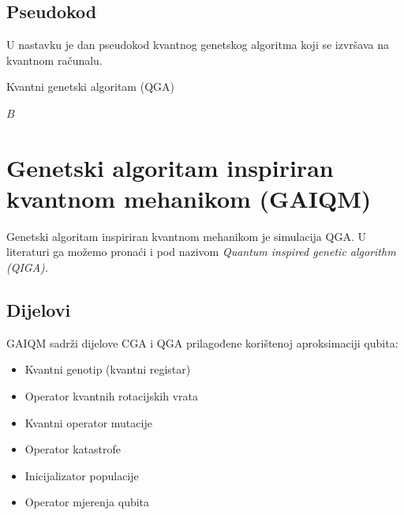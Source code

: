 \documentclass[times, utf8, zavrsni, numeric]{fer}
\begin{document}
\subsection{Pseudokod}
U nastavku je dan pseudokod kvantnog genetskog algoritma koji se izvršava na kvantnom računalu.

\begin{algorithm}
\caption{Kvantni genetski algoritam (QGA)}
\label{algo:qga}
\begin{algorithmic}
\ENDWHILE
\RETURN $B$
\end{algorithmic}
\end{algorithm}

\newpage

\section{Genetski algoritam inspiriran kvantnom mehanikom (GAIQM)}
Genetski algoritam inspiriran kvantnom mehanikom je simulacija QGA. U literaturi ga možemo pronaći i pod nazivom \it Quantum inspired genetic algorithm (QIGA)\rm. \citep{han_phd}

\subsection{Dijelovi}
GAIQM sadrži dijelove CGA i QGA prilagođene korištenoj aproksimaciji qubita:
\begin{itemize}
\item Kvantni genotip (kvantni registar)
\item Operator kvantnih rotacijskih vrata
\item Kvantni operator mutacije
\item Operator katastrofe
\item Inicijalizator populacije
\item Operator mjerenja qubita
\end{itemize}
\end{document}
